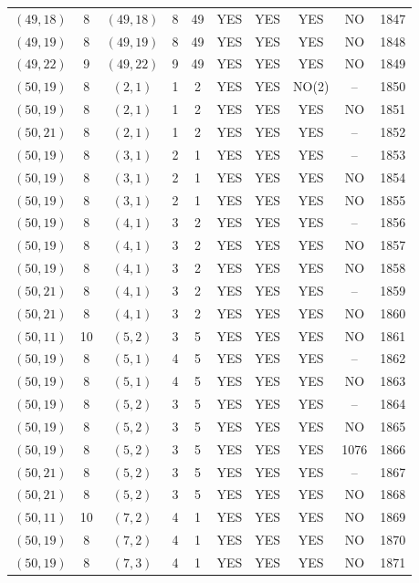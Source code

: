 \begin{longtable}{|c|c|c|c|c|c|c|c|c|c|}
$(49, 18)$ & 8 & $(49, 18)$ & 8 & 49 & YES & YES & YES & NO & 1847\\
$(49, 19)$ & 8 & $(49, 19)$ & 8 & 49 & YES & YES & YES & NO & 1848\\
$(49, 22)$ & 9 & $(49, 22)$ & 9 & 49 & YES & YES & YES & NO & 1849\\
$(50, 19)$ & 8 & $(2, 1)$ & 1 & 2 & YES & YES & NO(2) & -- & 1850\\
$(50, 19)$ & 8 & $(2, 1)$ & 1 & 2 & YES & YES & YES & NO & 1851\\
$(50, 21)$ & 8 & $(2, 1)$ & 1 & 2 & YES & YES & YES & -- & 1852\\
$(50, 19)$ & 8 & $(3, 1)$ & 2 & 1 & YES & YES & YES & -- & 1853\\
$(50, 19)$ & 8 & $(3, 1)$ & 2 & 1 & YES & YES & YES & NO & 1854\\
$(50, 19)$ & 8 & $(3, 1)$ & 2 & 1 & YES & YES & YES & NO & 1855\\
$(50, 19)$ & 8 & $(4, 1)$ & 3 & 2 & YES & YES & YES & -- & 1856\\
$(50, 19)$ & 8 & $(4, 1)$ & 3 & 2 & YES & YES & YES & NO & 1857\\
$(50, 19)$ & 8 & $(4, 1)$ & 3 & 2 & YES & YES & YES & NO & 1858\\
$(50, 21)$ & 8 & $(4, 1)$ & 3 & 2 & YES & YES & YES & -- & 1859\\
$(50, 21)$ & 8 & $(4, 1)$ & 3 & 2 & YES & YES & YES & NO & 1860\\
$(50, 11)$ & 10 & $(5, 2)$ & 3 & 5 & YES & YES & YES & NO & 1861\\
$(50, 19)$ & 8 & $(5, 1)$ & 4 & 5 & YES & YES & YES & -- & 1862\\
$(50, 19)$ & 8 & $(5, 1)$ & 4 & 5 & YES & YES & YES & NO & 1863\\
$(50, 19)$ & 8 & $(5, 2)$ & 3 & 5 & YES & YES & YES & -- & 1864\\
$(50, 19)$ & 8 & $(5, 2)$ & 3 & 5 & YES & YES & YES & NO & 1865\\
$(50, 19)$ & 8 & $(5, 2)$ & 3 & 5 & YES & YES & YES & 1076 & 1866\\
$(50, 21)$ & 8 & $(5, 2)$ & 3 & 5 & YES & YES & YES & -- & 1867\\
$(50, 21)$ & 8 & $(5, 2)$ & 3 & 5 & YES & YES & YES & NO & 1868\\
$(50, 11)$ & 10 & $(7, 2)$ & 4 & 1 & YES & YES & YES & NO & 1869\\
$(50, 19)$ & 8 & $(7, 2)$ & 4 & 1 & YES & YES & YES & NO & 1870\\
$(50, 19)$ & 8 & $(7, 3)$ & 4 & 1 & YES & YES & YES & NO & 1871\\

\end{longtable}
